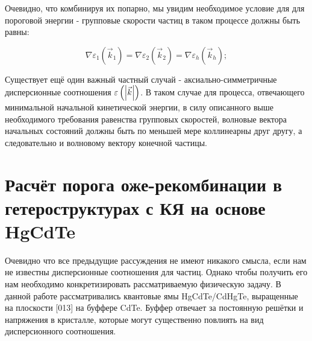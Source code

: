 \documentclass[../main.tex]{subfiles}
\begin{document}
    Очевидно, что комбинируя их попарно, мы увидим необходимое условие для для пороговой
    энергии - групповые скорости частиц в таком процессе должны быть равны:

    \begin{equation}
        \nabla \varepsilon_1(\vec{k}_1) = \nabla \varepsilon_2(\vec{k}_2) = \nabla \varepsilon_h(\vec{k}_h);
    \end{equation}

    




    Существует ещё один важный частный случай - аксиально-симметричные дисперсионные
    соотношения $\varepsilon\left(\abs{\vec k}\right)$. В таком случае для процесса,
    отвечающего минимальной начальной кинетической энергии, в силу описанного выше 
    необходимого требования равенства групповых скоростей, волновые вектора начальных
    состояний должны быть по меньшей мере коллинеарны друг другу, а следовательно и 
    волновому вектору конечной частицы.

    \section{Расчёт порога оже-рекомбинации в гетероструктурах с КЯ на основе HgCdTe}

        Очевидно что все предыдущие рассуждения не имеют никакого смысла, если нам не известны дисперсионные 
        соотношения для частиц. Однако чтобы получить его нам необходимо конкретизировать
        рассматриваемую физическую задачу. В данной работе рассматривались квантовые ямы HgCdTe/CdHgTe, выращенные 
        на плоскости [013] на буффере CdTe. Буффер отвечает за постоянную решётки и напряжения в кристалле,
        которые могут существенно повлиять на вид дисперсионного соотношения.
\end{document}
